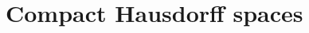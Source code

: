 \documentclass{beamer}
\newtheorem{remark}{Remark}
\begin{document}
\section{Compact Hausdorff spaces} %
%
\end{document}

